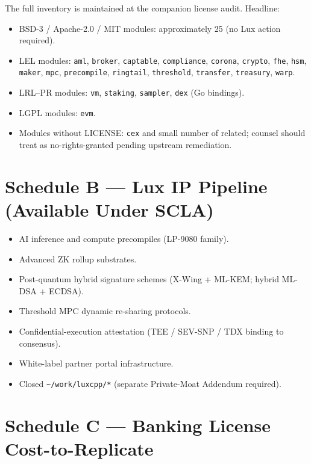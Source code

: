 \documentclass[11pt,letterpaper]{article}
\begin{document}
The full inventory is maintained at the companion license audit. Headline:

\begin{itemize}[leftmargin=1.5em,itemsep=0.1em]
\item BSD-3 / Apache-2.0 / MIT modules: approximately 25 (no Lux
action required).
\item LEL modules: \texttt{aml}, \texttt{broker}, \texttt{captable},
\texttt{compliance}, \texttt{corona}, \texttt{crypto}, \texttt{fhe},
\texttt{hsm}, \texttt{maker}, \texttt{mpc}, \texttt{precompile},
\texttt{ringtail}, \texttt{threshold}, \texttt{transfer},
\texttt{treasury}, \texttt{warp}.
\item LRL--PR modules: \texttt{vm}, \texttt{staking}, \texttt{sampler},
\texttt{dex} (Go bindings).
\item LGPL modules: \texttt{evm}.
\item Modules without LICENSE: \texttt{cex} and small number of
related; counsel should treat as no-rights-granted pending upstream
remediation.
\end{itemize}

\section*{Schedule B --- Lux IP Pipeline (Available Under SCLA)}

\begin{itemize}[leftmargin=1.5em,itemsep=0.1em]
\item AI inference and compute precompiles (LP-9080 family).
\item Advanced ZK rollup substrates.
\item Post-quantum hybrid signature schemes (X-Wing + ML-KEM; hybrid
ML-DSA + ECDSA).
\item Threshold MPC dynamic re-sharing protocols.
\item Confidential-execution attestation (TEE / SEV-SNP / TDX binding
to consensus).
\item White-label partner portal infrastructure.
\item Closed \texttt{\textasciitilde/work/luxcpp/*} (separate
Private-Moat Addendum required).
\end{itemize}

\section*{Schedule C --- Banking License Cost-to-Replicate}
\end{document}
